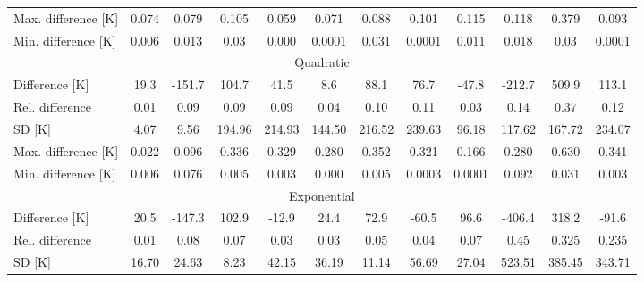 \begin{table}
\begin{tabular}{lccccccccccc}
        Max. difference {[}K{]} & 0.074                          & 0.079                         & 0.105   & 0.059   & 0.071   & 0.088   & 0.101   & 0.115   & 0.118   & 0.379   & 0.093   \\
        Min. difference {[}K{]} & 0.006                          & 0.013                         & 0.03    & 0.000   & 0.0001  & 0.031   & 0.0001  & 0.011   & 0.018   & 0.03    & 0.0001  \\ \hline
        \multicolumn{12}{c}{Quadratic}                                                                                                                                                 \\ \hline
        Difference {[}K{]}      & 19.3                           & -151.7                        & 104.7   & 41.5    & 8.6     & 88.1    & 76.7    & -47.8   & -212.7  & 509.9   & 113.1   \\
        Rel. difference         & 0.01                           & 0.09                          & 0.09    & 0.09    & 0.04    & 0.10    & 0.11    & 0.03    & 0.14    & 0.37    & 0.12    \\
        SD {[}K{]}              & 4.07                           & 9.56                          & 194.96  & 214.93  & 144.50  & 216.52  & 239.63  & 96.18   & 117.62  & 167.72  & 234.07  \\
        Max. difference {[}K{]} & 0.022                          & 0.096                         & 0.336   & 0.329   & 0.280   & 0.352   & 0.321   & 0.166   & 0.280   & 0.630   & 0.341   \\
        Min. difference {[}K{]} & 0.006                          & 0.076                         & 0.005   & 0.003   & 0.000   & 0.005   & 0.0003  & 0.0001  & 0.092   & 0.031   & 0.003   \\ \hline
        \multicolumn{12}{c}{Exponential}                                                                                                                                                   \\ \hline
        Difference {[}K{]}      & 20.5                           & -147.3                        & 102.9   & -12.9   & 24.4    & 72.9    & -60.5   & 96.6    & -406.4  & 318.2   & -91.6   \\
        Rel. difference         & 0.01                           & 0.08                          & 0.07    & 0.03    & 0.03    & 0.05    & 0.04    & 0.07    & 0.45    & 0.325   & 0.235    \\
        SD {[}K{]}              & 16.70                          & 24.63                         & 8.23    & 42.15   & 36.19   & 11.14   & 56.69   & 27.04   & 523.51  & 385.45  & 343.71  \\

\end{tabular}
\end{table}
